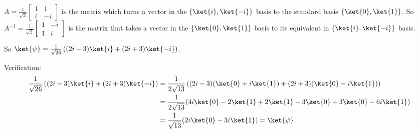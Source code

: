 \documentclass[11pt]{article}
\begin{document}
\begin{solution}
	$A = \frac{1}{\sqrt{2}} \begin{bmatrix}
		1 & 1 \\ i & -i 
	\end{bmatrix}$ is the matrix which turns a vector in the $\left\{ \ket{i}, \ket{-i} \right\}$ basis to the standard basis $\left\{ \ket{0}, \ket{1} \right\}$. So $A^{-1} = \frac{1}{\sqrt{2}} \begin{bmatrix}
		1 & -i \\ 1 & i
	\end{bmatrix}$ is the matrix that takes a vector in the $\left\{ \ket{0}, \ket{1} \right\}$ basis to its equivalent in $\left\{ \ket{i}, \ket{-i} \right\}$ basis. 
	
	So $\ket{\psi} = \frac{1}{\sqrt{26} } \left((2i - 3) \ket{i} + (2i + 3) \ket{-i}\right)$. 
	

	Verification: 
	\begin{align*}
		\frac{1}{\sqrt{26} } \left((2i - 3) \ket{i} + (2i + 3) \ket{-i}\right) &= \frac{1}{2\sqrt{13}}\left((2i - 3)(\ket{0} + i\ket{1}) + (2i + 3)(\ket{0} - i\ket{1})\right) \\
		&= \frac{1}{2\sqrt{13}}(4i \ket{0} - 2 \ket{1} + 2 \ket{1} - 3\ket{0} + 3\ket{0} - 6i \ket{1}) \\
		&= \frac{1}{\sqrt{13}}(2i \ket{0} - 3i\ket{1}) = \ket{\psi}
	\end{align*}
\end{solution}
\end{document}
